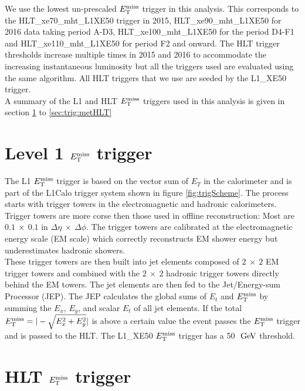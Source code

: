 \indent We use the lowest un-prescaled $E_{\mathrm{T}}^{\mathrm{miss}}$ trigger in this analysis.  This corresponds to the {\sc HLT\_xe70\_mht\_L1XE50} trigger in 2015,  {\sc HLT\_xe90\_mht\_L1XE50} for 2016 data taking period A-D3, {\sc HLT\_xe100\_mht\_L1XE50} for the period D4-F1 and {\sc HLT\_xe110\_mht\_L1XE50} for period F2 and onward. The HLT trigger thresholds increase multiple times in 2015 and 2016 to accommodate the increasing instantaneous luminosity but all the triggers used are evaluated using the same algorithm.  All HLT triggers that we use are seeded by the L1\_XE50 trigger. \\

\indent A summary of the L1 and HLT $E_{\mathrm{T}}^{\mathrm{miss}}$ triggers used in this analysis is given in section \ref{sec:trig:L1Calo} to \ref{sec:trig:metHLT}\\

\section{Level 1 $E_{\mathrm{T}}^{\mathrm{miss}}$ trigger}
\label{sec:trig:L1Calo}

\indent The L1 $E_{\mathrm{T}}^{\mathrm{miss}}$ trigger is based on the vector sum of $E_T$ in the calorimeter and is part of the L1Calo trigger system \cite{L1Calo} shown in figure \ref{fig:trigScheme}.  The process starts with trigger towers in the electromagnetic and hadronic calorimeters.  Trigger towers are more corse then those used in offline reconstruction: Most are $0.1~\times~0.1$ in $\Delta\eta~\times~\Delta\phi$.  The trigger towers are calibrated at the electromagnetic energy scale (EM scale) which correctly reconstructs EM shower energy but underestimates hadronic showers.  \\

\indent These trigger towers are then built into jet elements composed of $2~\times~2$ EM trigger towers and combined with the $2~\times~2$ hadronic trigger towers directly behind the EM towers. The jet elements are then fed to the Jet/Energy-sum Processor (JEP).  The JEP calculates the global sums of $E_t$ and $E_{\mathrm{T}}^{\mathrm{miss}}$ by summing the $E_x$, $E_y$, and scalar $E_t$ of all jet elements.  If the total $E_{\mathrm{T}}^{\mathrm{miss}} = |- \sqrt{E_x^2+E_y^2}|$ is above a certain value the event passes the $E_{\mathrm{T}}^{\mathrm{miss}}$ trigger and is passed to the HLT.  The L1\_XE50 $E_{\mathrm{T}}^{\mathrm{miss}}$ trigger has a 50 $\gev$ threshold. \\

\section{HLT $E_{\mathrm{T}}^{\mathrm{miss}}$ trigger}
\label{sec:trig:HLT_MET}

